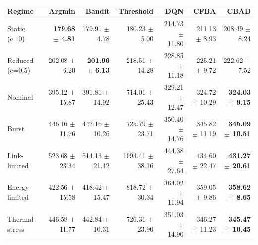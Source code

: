 \begin{tabular}{lrrrrrr}
\toprule
Regime & Argmin & Bandit & Threshold & DQN & CFBA & CBAD \\
\midrule
Static (c=0) & \textbf{179.68 $\pm$ 4.81} & 179.91 $\pm$ 4.78 & 180.23 $\pm$ 5.00 & 214.73 $\pm$ 11.80 & 211.13 $\pm$ 8.93 & 208.49 $\pm$ 8.24 \\
Reduced (c=0.5) & 202.08 $\pm$ 6.20 & \textbf{201.96 $\pm$ 6.13} & 218.51 $\pm$ 14.28 & 228.85 $\pm$ 11.18 & 225.21 $\pm$ 9.72 & 222.62 $\pm$ 7.52 \\
Nominal & 395.12 $\pm$ 15.87 & 391.81 $\pm$ 14.92 & 714.01 $\pm$ 25.43 & 329.21 $\pm$ 12.47 & 324.72 $\pm$ 10.29 & \textbf{324.03 $\pm$ 9.15} \\
Burst & 446.16 $\pm$ 11.76 & 442.16 $\pm$ 10.26 & 725.79 $\pm$ 23.71 & 350.40 $\pm$ 14.76 & 345.82 $\pm$ 11.19 & \textbf{345.09 $\pm$ 10.51} \\
Link-limited & 523.68 $\pm$ 23.34 & 514.13 $\pm$ 21.12 & 1093.41 $\pm$ 38.16 & 444.38 $\pm$ 27.64 & 434.60 $\pm$ 22.47 & \textbf{431.27 $\pm$ 20.61} \\
Energy-limited & 422.56 $\pm$ 15.58 & 418.42 $\pm$ 15.47 & 818.72 $\pm$ 30.34 & 364.02 $\pm$ 11.94 & 359.05 $\pm$ 9.86 & \textbf{358.62 $\pm$ 8.65} \\
Thermal-stress & 446.58 $\pm$ 11.77 & 442.84 $\pm$ 10.31 & 726.31 $\pm$ 23.90 & 351.03 $\pm$ 14.90 & 346.27 $\pm$ 11.23 & \textbf{345.47 $\pm$ 10.45} \\
\bottomrule
\end{tabular}
